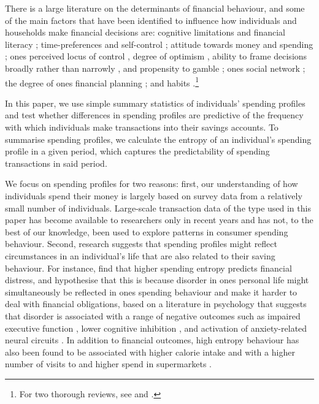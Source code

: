 There is a large literature on the determinants of financial behaviour, and
some of the main factors that have been identified to influence how
individuals and households make financial decisions are: cognitive limitations
and financial literacy \citep{agarwal2009age, agarwal2013cognitive,
    korniotis2011older, agarwal2010learning, fernandes2014financial,
    jorring2020financial}; time-preferences and self-control
    \citep{frederick2002time, read2018intertemporal, ericson2019intertemporal,
    cohen2020measuring}; attitude towards money and spending
    \citep{rick2008tightwads, rick2011fatal}; ones perceived locus of control
    \citep{perry2005control}, degree of optimism \citep{puri2007optimism},
    ability to frame decisions broadly rather than narrowly
    \citep{kumar2008decision}, and propensity to gamble
    \citep{kumar2009gambles}; ones social network \citep{bailey2018economic,
        kuchler2021social}; the degree of ones financial planning
        \citep{ameriks2003wealth}; and habits \citep{blumenstock2018defaults,
            schaner2018persistent, de2013deposit}.\footnote{For two thorough
        reviews, see \citet{agarwal2017shapes} and
    \citet{greenberg2019financial}.}

In this paper, we use simple summary statistics of individuals' spending
profiles and test whether differences in spending profiles are predictive of
the frequency with which individuals make transactions into their savings
accounts. To summarise spending profiles, we calculate the entropy of an
individual's spending profile in a given period, which captures the
predictability of spending transactions in said period.

We focus on spending
profiles for two reasons: first, our understanding of how individuals spend
their money is largely based on survey data from a relatively small number of
individuals. Large-scale transaction data of the type used in this paper has
become available to researchers only in recent years and has not, to the best
of our knowledge, been used to explore patterns in consumer spending behaviour. Second, research suggests that spending profiles might reflect circumstances in
an individual's life that are also related to their saving behaviour. For
instance, \citet{muggleton2020evidence} find that higher spending entropy
predicts financial distress, and hypothesise that this is because disorder in
ones personal life might simultaneously be reflected in ones spending behaviour
and make it harder to deal with financial obligations, based on a literature in
psychology that suggests that disorder is associated with a range of negative
outcomes such as impaired executive function \citep{vernon2016predictors},
lower cognitive inhibition \citep{mittal2015cognitive}, and activation of
anxiety-related neural circuits \citep{hirsh2012psychological}. In addition to
financial outcomes, high entropy behaviour has also been found to be associated
with higher calorie intake \citep{skatova2019those} and with a higher number of
visits to and higher spend in supermarkets \citep{guidotti2015behavioral}.

